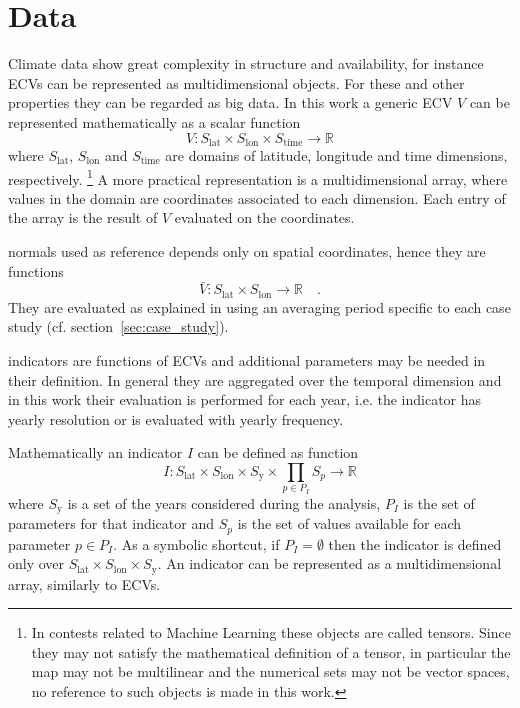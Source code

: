 \section{Data}
\label{sec:Data}
Climate data show great complexity in structure and availability, for instance \glspl{ECV} can be represented as multidimensional objects. For these and other properties they can be regarded as big data.\cite{2014FaghmousABig}
In this work a generic \gls{ECV} $V$ can be represented mathematically as a scalar function
\begin{equation}
  \label{eq:math_dataset}
  V : S_\text{lat} \times S_\text{lon} \times S_\text{time} \to \mathbb{R}
\end{equation}
where $S_\text{lat}$, $S_\text{lon}$ and $S_\text{time}$ are domains of latitude, longitude and time dimensions, respectively.%
\footnote{In contests related to Machine Learning these objects are called tensors. Since they may not satisfy the mathematical definition of a tensor, in particular the map may not be multilinear and the numerical sets may not be vector spaces, no reference to such objects is made in this work.}
A more practical representation is a multidimensional array, where values in the domain are coordinates associated to each dimension. Each entry of the array is the result of $V$ evaluated on the coordinates.

\Glspl{normal} used as reference depends only on spatial coordinates, hence they are functions
\begin{equation}
  \label{eq:math_normal}
  \bar{V} : S_\text{lat} \times S_\text{lon} \to \mathbb{R}
  \quad .
\end{equation}
They are evaluated as explained in \cite[6]{2017WorldMeteorologicalOrganizationWMOWMOGuidelines} using an averaging period specific to each case study (cf. section~\ref{sec:case_study}).

\Glspl{indicator} are functions of \glspl{ECV} and additional parameters may be needed in their definition. In general they are aggregated over the temporal dimension and in this work their evaluation is performed for each year, i.e. the \gls{indicator} has yearly resolution or is evaluated with yearly frequency.

Mathematically an \gls{indicator} $I$ can be defined as function
\begin{equation}
  \label{eq:math_indicator}
  I : S_\text{lat} \times S_\text{lon} \times S_\text{y} \times \prod_{p \in P_I} S_p \to \mathbb{R}
\end{equation}
where $S_\text{y}$ is a set of the years considered during the analysis, $P_I$ is the set of parameters for that indicator and $S_p$ is the set of values available for each parameter $p \in P_I$. As a symbolic shortcut, if $P_I = \emptyset$ then the indicator is defined only over $S_\text{lat} \times S_\text{lon} \times S_\text{y}$.
An indicator can be represented as a multidimensional array, similarly to \glspl{ECV}.

